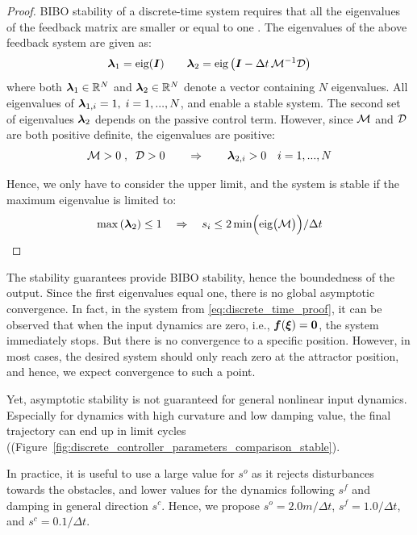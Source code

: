 \begin{proof}
BIBO stability of a discrete-time system requires that all the eigenvalues of the feedback matrix are smaller or equal to one \parencite{friedland2012control}.
The eigenvalues of the above feedback system are given as:
\begin{equation}
	\boldsymbol{\lambda}_1 = \text{eig}(\boldsymbol{I}) \qquad \boldsymbol{\lambda}_2 = \text{eig} \left(\boldsymbol{I} - \Delta t \, \mathcal{M}^{-1} \mathcal{D} \right)
\end{equation}
where both $\boldsymbol{\lambda}_1 \in \mathbb{R}^N$ and $\boldsymbol{\lambda}_2 \in \mathbb{R}^N$ denote a vector containing $N$ eigenvalues.
All eigenvalues of $\boldsymbol{\lambda}_{1, i} = 1, \; i = 1, ..., N$, and enable a stable system. 
The second set of eigenvalues $\boldsymbol{\lambda}_2$  depends on the passive control term. 
However, since $\mathcal{M}$ and $\mathcal{D}$ are both positive definite, the eigenvalues are positive:
\begin{equation}
	\mathcal{M} > 0 \; , \;\; \mathcal{D} > 0 
	\qquad \Rightarrow \qquad
	\boldsymbol{\lambda}_{2, i} > 0 \quad i = 1, ..., N
\end{equation}

Hence, we only have to consider the upper limit, and the system is stable if the maximum eigenvalue is limited to:
\begin{equation}
	\max \left(\boldsymbol{\lambda}_2 \right) \leq 1 
	\quad \Rightarrow \quad
	s_{i} \leq 2 \min \Bigl( \text{eig}\bigl(\mathcal{M}\bigr)  \Bigr) / \Delta t
\end{equation}
\end{proof}

The stability guarantees provide BIBO stability, hence the boundedness of the output. 
Since the first eigenvalues equal one, there is no global asymptotic convergence. 
In fact, in the system from \eqref{eq:discrete_time_proof}, it can be observed that when the input dynamics are zero, i.e., $\boldsymbol{f}(\boldsymbol{\xi}) = \boldsymbol{0}$, the system immediately stops. But there is no convergence to a specific position.
However, in most cases, the desired system should only reach zero at the attractor position, and hence, we expect convergence to such a point.

\ifthesis
Yet, asymptotic stability is not guaranteed for general nonlinear input dynamics. Especially for dynamics with high curvature and low damping value, the final trajectory can end up in limit cycles ((Figure~\ref{fig:discrete_controller_parameters_comparison_stable}).
\fi

In practice, it is useful to use a large value for $s^{o}$ as it rejects disturbances towards the obstacles, and lower values for the dynamics following $s^{f}$ and damping in general direction $s^{c}$. Hence, we propose $s^{o} = 2.0 m / \Delta t$, $s^{f} = 1.0 / \Delta t$, and $s^c = 0.1 / \Delta t$.


